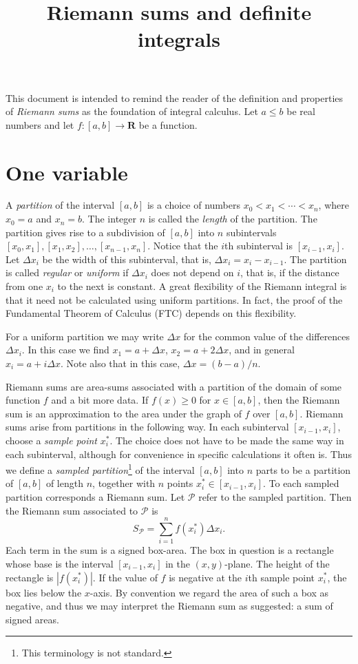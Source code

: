 \documentclass[12pt]{amsart}
\title{Riemann sums and definite integrals}
\begin{document}
\maketitle
This document is intended to remind the reader of the definition and properties of \emph{Riemann sums} as the foundation of integral calculus. Let $a \leq b$ be real numbers and let $f \colon [a,b] \to \mathbf{R}$ be a function.

\section{One variable}

A \emph{partition} of the interval $[a,b]$ is a choice of numbers $x_0 < x_1 < \cdots < x_n$, where $x_0 = a$ and $x_n = b$. The integer $n$ is called the \emph{length} of the partition. The partition gives rise to a subdivision of $[a,b]$ into $n$ subintervals $[x_0,x_1], [x_1,x_2], \ldots, [x_{n-1}, x_n]$. Notice that the $i$th subinterval is $[x_{i-1},x_i]$. Let $\Delta x_i$ be the width of this subinterval, that is, $\Delta x_i = x_i - x_{i-1}$. The partition is called \emph{regular} or \emph{uniform} if $\Delta x_i$ does not depend on $i$, that is, if the distance from one $x_i$ to the next is constant. A great flexibility of the Riemann integral is that it need not be calculated using uniform partitions. In fact, the proof of the Fundamental Theorem of Calculus (FTC) depends on this flexibility.

For a uniform partition we may write $\Delta x$ for the common value of the differences $\Delta x_i$. In this case we find $x_1 = a + \Delta x$, $x_2 = a + 2 \Delta x$, and in general $x_i = a + i \Delta x$. Note also that in this case, $\Delta x = (b-a)/n$.

Riemann sums are area-sums associated with a partition of the domain of some function $f$ and a bit more data. If $f(x) \geq 0$ for $x \in [a,b]$, then the Riemann sum is an approximation to the area under the graph of $f$ over $[a,b]$. Riemann sums arise from partitions in the following way. In each subinterval $[x_{i-1},x_i]$, choose a \emph{sample point} $x^{\ast}_i$. The choice does not have to be made the same way in each subinterval, although for convenience in specific calculations it often is. Thus we define a \emph{sampled partition}\footnote{This terminology is not standard.} of the interval $[a,b]$ into $n$ parts to be a partition of $[a,b]$ of length $n$, together with $n$ points $x^{\ast}_i \in [x_{i-1},x_i]$. To each sampled partition corresponds a Riemann sum. Let $\mathcal{P}$ refer to the sampled partition. Then the Riemann sum associated to $\mathcal{P}$ is
\[
S_{\mathcal{P}} = \sum_{i=1}^n f(x^{\ast}_i) \Delta x_i.
\]
Each term in the sum is a signed box-area. The box in question is a rectangle whose base is the interval $[x_{i-1},x_i]$ in the $(x,y)$-plane. The height of the rectangle is $|f(x^{\ast}_i)|$. If the value of $f$ is negative at the $i$th sample point $x^{\ast}_i$, the box lies below the $x$-axis. By convention we regard the area of such a box as negative, and thus we may interpret the Riemann sum as suggested: a sum of signed areas.
\end{document}

